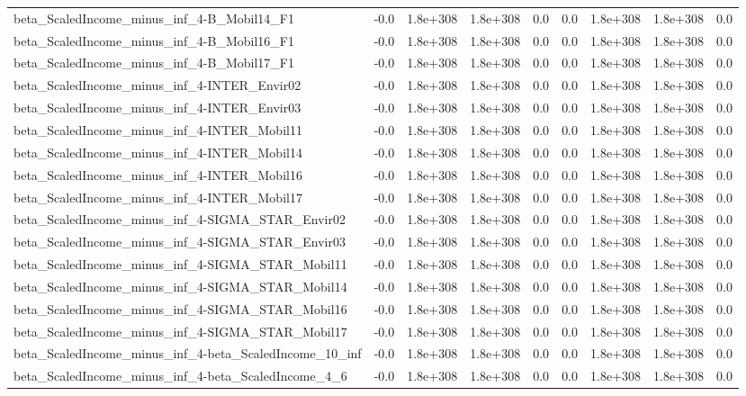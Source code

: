 \begin{tabular}{lrrrrrrrr}
beta_ScaledIncome_minus_inf_4-B_Mobil14_F1 & -0.0 & 1.8e+308 & 1.8e+308 & 0.0 & 0.0 & 1.8e+308 & 1.8e+308 & 0.0 \\
beta_ScaledIncome_minus_inf_4-B_Mobil16_F1 & -0.0 & 1.8e+308 & 1.8e+308 & 0.0 & 0.0 & 1.8e+308 & 1.8e+308 & 0.0 \\
beta_ScaledIncome_minus_inf_4-B_Mobil17_F1 & -0.0 & 1.8e+308 & 1.8e+308 & 0.0 & 0.0 & 1.8e+308 & 1.8e+308 & 0.0 \\
beta_ScaledIncome_minus_inf_4-INTER_Envir02 & -0.0 & 1.8e+308 & 1.8e+308 & 0.0 & 0.0 & 1.8e+308 & 1.8e+308 & 0.0 \\
beta_ScaledIncome_minus_inf_4-INTER_Envir03 & -0.0 & 1.8e+308 & 1.8e+308 & 0.0 & 0.0 & 1.8e+308 & 1.8e+308 & 0.0 \\
beta_ScaledIncome_minus_inf_4-INTER_Mobil11 & -0.0 & 1.8e+308 & 1.8e+308 & 0.0 & 0.0 & 1.8e+308 & 1.8e+308 & 0.0 \\
beta_ScaledIncome_minus_inf_4-INTER_Mobil14 & -0.0 & 1.8e+308 & 1.8e+308 & 0.0 & 0.0 & 1.8e+308 & 1.8e+308 & 0.0 \\
beta_ScaledIncome_minus_inf_4-INTER_Mobil16 & -0.0 & 1.8e+308 & 1.8e+308 & 0.0 & 0.0 & 1.8e+308 & 1.8e+308 & 0.0 \\
beta_ScaledIncome_minus_inf_4-INTER_Mobil17 & -0.0 & 1.8e+308 & 1.8e+308 & 0.0 & 0.0 & 1.8e+308 & 1.8e+308 & 0.0 \\
beta_ScaledIncome_minus_inf_4-SIGMA_STAR_Envir02 & -0.0 & 1.8e+308 & 1.8e+308 & 0.0 & 0.0 & 1.8e+308 & 1.8e+308 & 0.0 \\
beta_ScaledIncome_minus_inf_4-SIGMA_STAR_Envir03 & -0.0 & 1.8e+308 & 1.8e+308 & 0.0 & 0.0 & 1.8e+308 & 1.8e+308 & 0.0 \\
beta_ScaledIncome_minus_inf_4-SIGMA_STAR_Mobil11 & -0.0 & 1.8e+308 & 1.8e+308 & 0.0 & 0.0 & 1.8e+308 & 1.8e+308 & 0.0 \\
beta_ScaledIncome_minus_inf_4-SIGMA_STAR_Mobil14 & -0.0 & 1.8e+308 & 1.8e+308 & 0.0 & 0.0 & 1.8e+308 & 1.8e+308 & 0.0 \\
beta_ScaledIncome_minus_inf_4-SIGMA_STAR_Mobil16 & -0.0 & 1.8e+308 & 1.8e+308 & 0.0 & 0.0 & 1.8e+308 & 1.8e+308 & 0.0 \\
beta_ScaledIncome_minus_inf_4-SIGMA_STAR_Mobil17 & -0.0 & 1.8e+308 & 1.8e+308 & 0.0 & 0.0 & 1.8e+308 & 1.8e+308 & 0.0 \\
beta_ScaledIncome_minus_inf_4-beta_ScaledIncome_10_inf & -0.0 & 1.8e+308 & 1.8e+308 & 0.0 & 0.0 & 1.8e+308 & 1.8e+308 & 0.0 \\
beta_ScaledIncome_minus_inf_4-beta_ScaledIncome_4_6 & -0.0 & 1.8e+308 & 1.8e+308 & 0.0 & 0.0 & 1.8e+308 & 1.8e+308 & 0.0 \\

\end{tabular}

